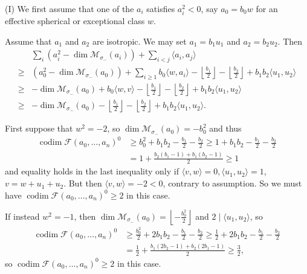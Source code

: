 \documentclass[leqno,11pt]{amsart}
\def\codim{\mathop{\mathrm{codim}}\nolimits}
\def\dim{\mathop{\mathrm{dim}}\nolimits}
\theoremstyle{definition}
\def\FF{\ensuremath{\mathcal F}}
\def\MM{\ensuremath{\mathcal M}}
\begin{document}
(I) We first assume that one of the $a_i$ satisfies $a_i^2<0$, say $a_0=b_0 w$ for an effective spherical or exceptional class $w$.  

Assume that $a_1$ and $a_2$ are isotropic.
We may set $a_1=b_1 u_1$ and $a_2=b_2 u_2$.
Then 
 \begin{equation}\label{eq: 1,1 case I}
\begin{split}
& \sum_i (a_i^2-\dim \MM_{\sigma_-}(a_i))+\sum_{i<j}\langle a_i,a_j \rangle\\
\geq & (a_0^2-\dim \MM_{\sigma_-}(a_0))+\sum_{i \geq 1}b_0 \langle w,a_i \rangle
-\left\lfloor\frac{b_1}{2}\right\rfloor-\left\lfloor\frac{b_2}{2}\right\rfloor+b_1 b_2 \langle u_1,u_2 \rangle\\
\geq & -\dim\MM_{\sigma_-}(a_0)+b_0 \langle w,v \rangle-\left\lfloor\frac{b_1}{2}\right\rfloor-\left\lfloor\frac{b_2}{2}\right\rfloor+b_1 b_2 \langle u_1,u_2 \rangle\\
\geq & -\dim\MM_{\sigma_-}(a_0)-\left\lfloor\frac{b_1}{2}\right\rfloor-\left\lfloor\frac{b_2}{2}\right\rfloor+b_1 b_2 \langle u_1,u_2 \rangle.
\end{split}
\end{equation} 

First suppose that $w^2=-2$, so $\dim\MM_{\sigma_-}(a_0)=-b_0^2$ and thus 
\begin{equation}\label{eq: 1,1 case I spherical}
\begin{split}
\codim\FF(a_0,\ldots,a_n)^0 &\geq b_0^2+b_1 b_2-\frac{b_1}{2}-\frac{b_2}{2}\geq 1+b_1 b_2-\frac{b_1}{2}-\frac{b_2}{2}\\
&=1+\frac{b_2(b_1-1)+b_1(b_2-1)}{2}\geq 1
\end{split}
\end{equation}
and equality holds in the last inequality only if $\langle v, w\rangle=0,\langle u_1,u_2\rangle=1$, $v=w+u_1+u_2$.  But then $\langle v,w\rangle=-2<0$, contrary to assumption.  So we must have $\codim\FF(a_0,...,a_n)^0\geq 2$ in this case.

If instead $w^2=-1$, then $\dim\MM_{\sigma_-}(a_0)=\left\lfloor-\frac{b_0^2}{2}\right\rfloor$ and $2\mid\langle u_1,u_2\rangle$, so
\begin{equation}\label{eq: 1,1 case I exceptional}
\begin{split}
\codim\FF(a_0,\ldots,a_n)^0 &\geq \frac{b_0^2}{2}+2b_1b_2-\frac{b_1}{2}-\frac{b_2}{2}\geq\frac{1}{2}+2b_1b_2-\frac{b_1}{2}-\frac{b_2}{2}\\
&=\frac{1}{2}+\frac{b_1(2b_2-1)+b_2(2b_1-1)}{2}\geq\frac{3}{2},
\end{split}
\end{equation}
so $\codim\FF(a_0,\ldots,a_n)^0\geq 2$ in this case.
\end{document}
